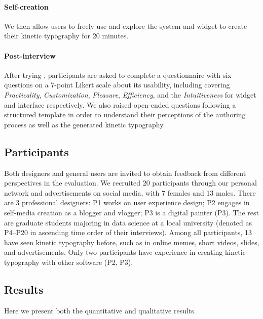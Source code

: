 \paragraph{Self-creation}
We then allow users to freely use and explore the system and widget to create their kinetic typography for 20 minutes. 

\paragraph{Post-interview}
After trying \tool, participants are asked to complete a questionnaire with six questions on a 7-point Likert scale about its usability, including covering \textit{Practicality}, \textit{Customization}, \textit{Pleasure}, \textit{Efficiency}, and the \textit{Intuitiveness} for widget and interface respectively.
We also raised open-ended questions following a structured template in order to understand their perceptions of the authoring process as well as the generated kinetic typography.




\subsection{Participants}
Both designers and general users are invited to obtain feedback from different perspectives in the evaluation.
We recruited 20 participants through our personal network and advertisements on social media, with 7 females and 13 males.
There are 3 professional designers: P1 works on user experience design; P2 engages in self-media creation as a blogger and vlogger; P3 is a digital painter (P3).
The rest are graduate students majoring in data science at a local university (denoted as P4–P20 in ascending time order of their interviews).
Among all participants, 13 have seen kinetic typography before, such as in online memes, short videos, slides, and advertisements. 
Only two participants have experience in creating kinetic typography with other software (P2, P3). 

\subsection{Results}
Here we present both the quantitative and qualitative results.

